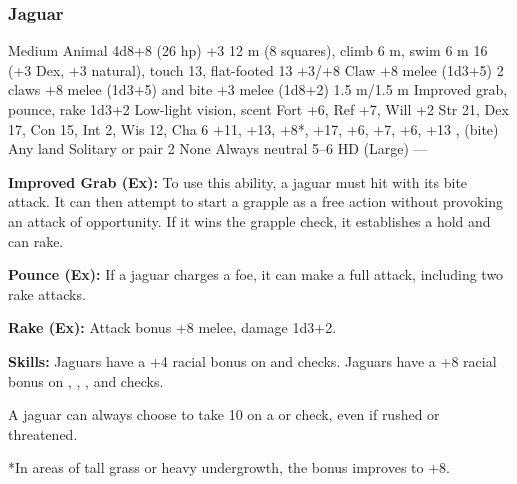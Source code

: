 \subsubsection{Jaguar}
\begin{MonsterStats}
{Medium Animal}
{4d8+8 (26 hp)}
{+3}
{12 m (8 squares), climb 6 m, swim 6 m}
{16 (+3 Dex, +3 natural), touch 13, flat-footed 13}
{+3/+8}
{Claw +8 melee (1d3+5)}
{2 claws +8 melee (1d3+5) and bite +3 melee (1d8+2)}
{1.5 m/1.5 m}
{Improved grab, pounce, rake 1d3+2}
{Low-light vision, scent}
{Fort +6, Ref +7, Will +2}
{Str 21, Dex 17, Con 15, Int 2, Wis 12, Cha 6}
{
     +11,
     +13,
     +8*,
     +17,
     +6,
     +7,
     +6,
     +13
}
{,  (bite)}
{Any land}
{Solitary or pair}
{2}
{None}
{Always neutral}
{5--6 HD (Large)}
{---}
\end{MonsterStats}


\textbf{Improved Grab (Ex):} To use this ability, a jaguar must hit with its bite attack. It can then attempt to start a grapple as a free action without provoking an attack of opportunity. If it wins the grapple check, it establishes a hold and can rake.

\textbf{Pounce (Ex):} If a jaguar charges a foe, it can make a full attack, including two rake attacks.

\textbf{Rake (Ex):} Attack bonus +8 melee, damage 1d3+2.

\textbf{Skills:} Jaguars have a +4 racial bonus on  and  checks. Jaguars have a +8 racial bonus on , , , and  checks.

A jaguar can always choose to take 10 on a  or  check, even if rushed or threatened.

*In areas of tall grass or heavy undergrowth, the  bonus improves to +8.

